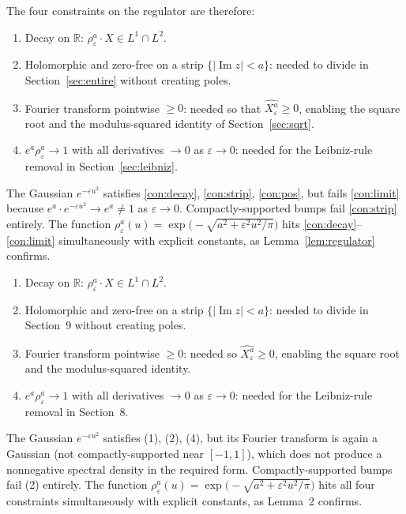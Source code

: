 \documentclass[12pt]{amsart}
\theoremstyle{remark}
\begin{document}
The four constraints on the regulator are therefore:
\begin{enumerate}
\label{list:constraints}
\item\label{con:decay} Decay on $\mathbb{R}$: $\rho_\varepsilon^a \cdot
  X \in L^1 \cap L^2$.
\item\label{con:strip} Holomorphic and zero-free on a strip
  $\{|\operatorname{Im} z| < a\}$: needed to divide in
  Section~\ref{sec:entire} without creating poles.
\item\label{con:pos} Fourier transform pointwise $\geq 0$: needed so
  that $\widehat{X_\varepsilon^a} \geq 0$, enabling the square root
  and the modulus-squared identity of Section~\ref{sec:sqrt}.
\item\label{con:limit} $e^a \rho_\varepsilon^a \to 1$ with all
  derivatives $\to 0$ as $\varepsilon \to 0$: needed for the
  Leibniz-rule removal in Section~\ref{sec:leibniz}.
\end{enumerate}

The Gaussian $e^{-\varepsilon u^2}$ satisfies \eqref{con:decay},
\eqref{con:strip}, \eqref{con:pos}, but fails \eqref{con:limit}
because $e^a \cdot e^{-\varepsilon u^2} \to e^a \neq 1$ as
$\varepsilon \to 0$.  Compactly-supported bumps fail \eqref{con:strip}
entirely.  The function $\rho_\varepsilon^a(u) = \exp\!\bigl(-\sqrt{a^2
+ \varepsilon^2 u^2/\pi}\bigr)$ hits
\eqref{con:decay}--\eqref{con:limit} simultaneously with explicit
constants, as Lemma~\ref{lem:regulator} confirms.

\begin{enumerate}
\item Decay on $\mathbb{R}$: $\rho_\varepsilon^a \cdot X \in L^1 \cap
  L^2$.
\item Holomorphic and zero-free on a strip $\{|\operatorname{Im} z| <
  a\}$: needed to divide in Section~9 without creating poles.
\item Fourier transform pointwise $\geq 0$: needed so
  $\widehat{X_\varepsilon^a} \geq 0$, enabling the square root and the
  modulus-squared identity.
\item $e^a \rho_\varepsilon^a \to 1$ with all derivatives $\to 0$ as
  $\varepsilon \to 0$: needed for the Leibniz-rule removal in
  Section~8.
\end{enumerate}

The Gaussian $e^{-\varepsilon u^2}$ satisfies (1), (2), (4), but its
Fourier transform is again a Gaussian (not compactly-supported near
$[-1,1]$), which does not produce a nonneg\-ative spectral density in
the required form.  Compactly-supported bumps fail (2) entirely.  The
function $\rho_\varepsilon^a(u) = \exp\!\bigl(-\sqrt{a^2 +
\varepsilon^2 u^2/\pi}\bigr)$ hits all four constraints simultaneously
with explicit constants, as Lemma~2 confirms.
\end{document}
